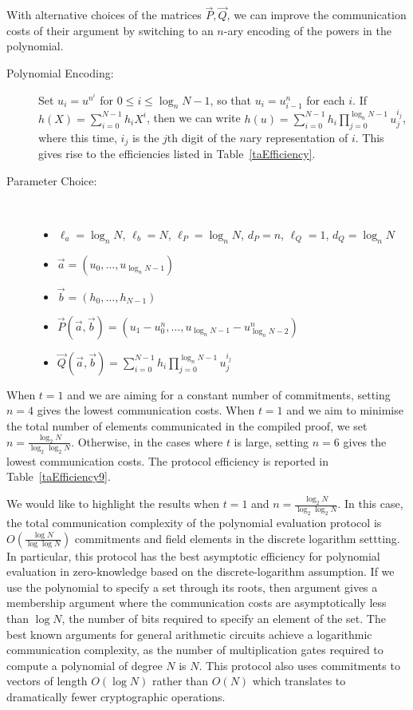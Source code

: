 With alternative choices of the matrices $\vec{P},\vec{Q}$, we can improve the communication costs of their argument by switching to an $n$-ary encoding of the powers in the polynomial.
\begin{description}
\item[ Polynomial Encoding: ] Set $u_i = u^{n^i}$ for $0 \leq i \leq \log_n N - 1$, so that $u_i = u_{i-1}^n$ for each $i$. If $h(X) = \sum_{i=0}^{N-1} h_i X^i$, then we can write $h(u) = \sum_{i=0}^{N-1} h_i \prod_{j=0}^{\log_n N - 1} u_j^{i_j}$, where this time, $i_j$ is the $j$th digit of the $n$ary representation of $i$. This gives rise to the efficiencies listed in Table~\ref{taEfficiency}.
\item[ Parameter Choice: ] \ 
\begin{itemize}
\item $\ell_a=\log_nN$, $\ell_b=N$, $\ell_P=\log_n N$, $d_P=n$, $\ell_Q=1$, $d_Q=\log_n N$
\item $\vec{a} = (u_0,\ldots,u_{\log_n N-1})$
\item $\vec{b} = (h_0,\ldots,h_{N-1})$
\item $\vec{P}(\vec{a},\vec{b}) = (u_1 - u_0^n, \ldots, u_{\log_n N-1} - u_{\log_n N-2}^n)$
\item $\vec{Q}(\vec{a},\vec{b}) = \sum_{i=0}^{N-1} h_{i} \prod_{j=0}^{\log_n N-1} u_j^{i_j}$
\end{itemize}
\end{description}

When $t=1$ and we are aiming for a constant number of commitments, setting $n=4$ gives the lowest communication costs. When $t=1$ and we aim to minimise the total number of elements communicated in the compiled proof, we set $n = \frac{\log_2N}{\log_2 \log_2 N}$. Otherwise, in the cases where $t$ is large, setting $n=6$ gives the lowest communication costs. The protocol efficiency is reported in Table~\ref{taEfficiency9}. 

We would like to highlight the results when $t=1$ and $n = \frac{\log_2N}{\log_2 \log_2 N}$. In this case, the total communication complexity of the polynomial evaluation protocol is $O\left(\frac{\log N}{\log \log N}\right)$ commitments and field elements in the discrete logarithm settting. In particular, this protocol has the best asymptotic efficiency for polynomial evaluation in zero-knowledge based on the discrete-logarithm assumption. If we use the polynomial to specify a set through its roots, then argument gives a membership argument where the communication costs are asymptotically less than $\log N$, the number of bits required to specify an element of the set. The best known arguments for general arithmetic circuits \cite{BootleCCGP16,BunzBBPWM18} achieve a logarithmic communication complexity, as the number of multiplication gates required to compute a polynomial of degree $N$ is $N$. This protocol also uses commitments to vectors of length $O(\log N)$ rather than $O(N)$ which translates to dramatically fewer cryptographic operations.

